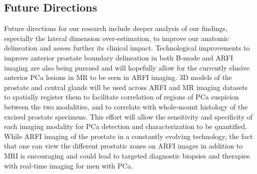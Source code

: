 \subsection{Future Directions}
Future directions for our research include deeper analysis of our findings,
especially the lateral dimension over-estimation, to improve our anatomic
delineation and assess further its clinical impact.  Technological improvements
to improve anterior prostate boundary delineation in both B-mode and ARFI
imaging are also being pursued and will hopefully allow for the currently
elusive anterior PCa lesions in MR to be seen in ARFI imaging.  3D models of
the prostate and central glands will be used across ARFI and MR imaging
datasets to spatially register them to facilitate correlation of regions of PCa
suspicion between the two modalities, and to correlate with whole-mount
histology of the excised prostate specimens.  This effort will allow the
sensitivity and specificity of each imaging modality for PCa detection and
characterization to be quantified.  While ARFI imaging of the prostate in a
constantly evolving technology, the fact that one can view the different
prostatic zones on ARFI images in addition to MRI is encouraging and could lead
to targeted diagnostic biopsies and therapies with real-time imaging for men
with PCa. 

